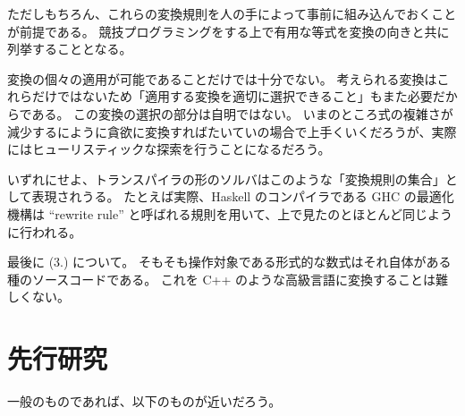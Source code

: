 \documentclass{ltjsarticle}
\begin{document}
ただしもちろん、これらの変換規則を人の手によって事前に組み込んでおくことが前提である。
競技プログラミングをする上で有用な等式を変換の向きと共に列挙することとなる。

変換の個々の適用が可能であることだけでは十分でない。
考えられる変換はこれらだけではないため「適用する変換を適切に選択できること」もまた必要だからである。
この変換の選択の部分は自明ではない。
いまのところ式の複雑さが減少するにように貪欲に変換すればたいていの場合で上手くいくだろうが、実際にはヒューリスティックな探索を行うことになるだろう。

いずれにせよ、トランスパイラの形のソルバはこのような「変換規則の集合」として表現されうる。
たとえば実際、Haskell のコンパイラである GHC の最適化機構は ``rewrite rule'' と呼ばれる規則を用いて、上で見たのとほとんど同じように行われる。

最後に (3.) について。
そもそも操作対象である形式的な数式はそれ自体がある種のソースコードである。
これを C++ のような高級言語に変換することは難しくない。





\section{先行研究}

一般のものであれば、以下のものが近いだろう。
\end{document}
